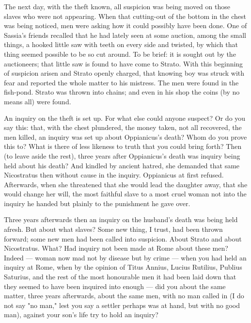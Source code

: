  The next day, with the theft known, all suspicion was being moved on those slaves who were not appearing. When that cutting-out of the bottom in the chest was being noticed, men were asking how it could possibly have been done. One of Sassia's friends recalled that he had lately seen at some auction, among the small things, a hooked little saw with teeth on every side and twisted, by which that thing seemed possible to be so cut around. To be brief: it is sought out by the auctioneers; that little saw is found to have come to Strato. With this beginning of suspicion arisen and Strato openly charged, that knowing boy was struck with fear and reported the whole matter to his mistress. The men were found in the fish-pond. Strato was thrown into chains; and even in his shop the coins (by no means all) were found.

 An inquiry on the theft is set up. For what else could anyone suspect? Or do you say this: that, with the chest plundered, the money taken, not all recovered, the men killed, an inquiry was set up about Oppianicus's death? Whom do you prove this to? What is there of less likeness to truth that you could bring forth? Then (to leave aside the rest), three years after Oppianicus's death was inquiry being held about his death? And kindled by ancient hatred, she demanded that same Nicostratus then without cause in the inquiry. Oppianicus at first refused. Afterwards, when she threatened that she would lead the daughter away, that she would change her will, the most faithful slave to a most cruel woman not into the inquiry he handed but plainly to the punishment he gave over.

 Three years afterwards then an inquiry on the husband's death was being held afresh. But about what slaves? Some new thing, I trust, had been thrown forward; some new men had been called into suspicion. About Strato and about Nicostratus. What? Had inquiry not been made at Rome about these men? Indeed --- woman now mad not by disease but by crime --- when you had held an inquiry at Rome, when by the opinion of Titus Annius, Lucius Rutilius, Publius Saturius, and the rest of the most honourable men it had been laid down that they seemed to have been inquired into enough --- did you about the same matter, three years afterwards, about the same men, with no man called in (I do not say "no man," lest you say a settler perhaps was at hand, but with no good man), against your son's life try to hold an inquiry?

